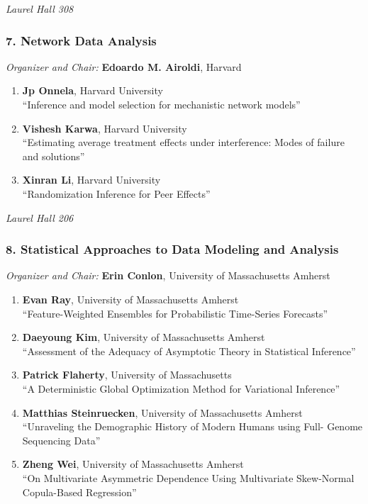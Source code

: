 \emph{Laurel Hall 308} \\[.5em]

\subsubsection*{7. Network Data Analysis}

\emph{Organizer and Chair:} \textbf{Edoardo M. Airoldi}, Harvard

\begin{enumerate}
\item \textbf{Jp Onnela}, Harvard University \\
``Inference and model selection for mechanistic network models''
\item \textbf{Vishesh Karwa}, Harvard University \\
``Estimating average treatment effects under interference: Modes of failure and solutions''
\item \textbf{Xinran Li}, Harvard University \\
``Randomization Inference for Peer Effects''
\end{enumerate}

\emph{Laurel Hall 206} \\[.5em]

\subsubsection*{8. Statistical Approaches to Data Modeling and Analysis}

\emph{Organizer and Chair:} \textbf{Erin Conlon}, University of Massachusetts Amherst

\begin{enumerate}
\item \textbf{Evan Ray}, University of Massachusetts Amherst \\
``Feature-Weighted Ensembles for Probabilistic Time-Series Forecasts''
\item \textbf{Daeyoung Kim}, University of Massachusetts Amherst \\
``Assessment of the Adequacy of Asymptotic Theory in Statistical Inference''
\item \textbf{Patrick Flaherty}, University of Massachusetts \\
``A Deterministic Global Optimization Method for Variational Inference''
\item \textbf{Matthias Steinruecken}, University of Massachusetts Amherst \\
``Unraveling the Demographic History of Modern Humans using Full- Genome Sequencing Data''
\item \textbf{Zheng Wei}, University of Massachusetts Amherst \\
``On Multivariate Asymmetric Dependence Using Multivariate Skew-Normal Copula-Based Regression''
\end{enumerate}

